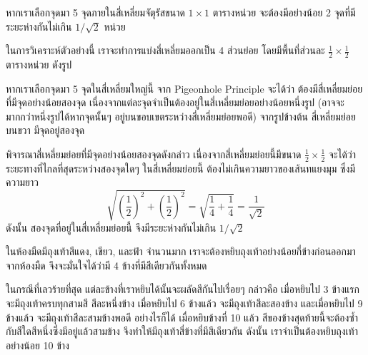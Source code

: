\begin{example}
หากเราเลือกจุดมา 5 จุดภายในสี่เหลี่ยมจัตุรัสขนาด $1\times 1$ ตารางหน่วย จะต้องมีอย่างน้อย 2 จุดที่มีระยะห่างกันไม่เกิน $1/\sqrt{2}$ หน่วย

ในการวิเคราะห์ตัวอย่างนี้ เราจะทำการแบ่งสี่เหลี่ยมออกเป็น 4 ส่วนย่อย โดยมีพื้นที่ส่วนละ $\frac{1}{2}\times\frac{1}{2}$ ตารางหน่วย ดังรูป
\begin{center}
\end{center}
หากเราเลือกจุดมา 5 จุดในสี่เหลี่ยมใหญ่นี้ จาก Pigeonhole Principle จะได้ว่า ต้องมีสี่เหลี่ยมย่อยที่มีจุดอย่างน้อยสองจุด เนื่องจากแต่ละจุดจำเป็นต้องอยู่ในสี่เหลี่ยมย่อยอย่างน้อยหนึ่งรูป (อาจจะมากกว่าหนึ่งรูปได้หากจุดนั้นๆ อยู่บนขอบเขตระหว่างสี่เหลี่ยมย่อยพอดี) \enskip จากรูปข้างต้น สี่เหลี่ยมย่อยบนขวา มีจุดอยู่สองจุด

พิจารณาสี่เหลี่ยมย่อยที่มีจุดอย่างน้อยสองจุดดังกล่าว \enskip เนื่องจากสี่เหลี่ยมย่อยนี้มีขนาด $\frac{1}{2}\times\frac{1}{2}$ จะได้ว่า ระยะทางที่ไกลที่สุดระหว่างสองจุดใดๆ ในสี่เหลี่ยมย่อยนี้ ต้องไม่เกินความยาวของเส้นทแยงมุม ซึ่งมีความยาว
\[\sqrt{\left(\frac{1}{2}\right)^2+\left(\frac{1}{2}\right)^2}=\sqrt{\frac{1}{4}+\frac{1}{4}}=\frac{1}{\sqrt{2}}\]
ดังนั้น สองจุดที่อยู่ในสี่เหลี่ยมย่อยนี้ จึงมีระยะห่างกันไม่เกิน $1/\sqrt{2}$
\end{example}

\begin{example}
ในห้องมืดมีถุงเท้าสีแดง, เขียว, และฟ้า จำนวนมาก \enskip เราจะต้องหยิบถุงเท้าอย่างน้อยกี่ข้างก่อนออกมาจากห้องมืด จึงจะมั่นใจได้ว่ามี 4 ข้างที่มีสีเดียวกันทั้งหมด

ในกรณีที่เลวร้ายที่สุด แต่ละข้างที่เราหยิบได้นั้นจะผลัดสีกันไปเรื่อยๆ กล่าวคือ เมื่อหยิบไป 3 ข้างแรก จะมีถุงเท้าครบทุกสามสี สีละหนึ่งข้าง \enskip เมื่อหยิบไป 6 ข้างแล้ว จะมีถุงเท้าสีละสองข้าง \enskip และเมื่อหยิบไป 9 ข้างแล้ว จะมีถุงเท้าสีละสามข้างพอดี \enskip อย่างไรก็ได้ เมื่อหยิบข้างที่ 10 แล้ว สีของข้างสุดท้ายนี้จะต้องซ้ำกับสีใดสีหนึ่งซึ่งมีอยู่แล้วสามข้าง จึงทำให้มีถุงเท้าสี่ข้างที่มีสีเดียวกัน \enskip ดังนั้น เราจำเป็นต้องหยิบถุงเท้าอย่างน้อย 10 ข้าง
\end{example}

